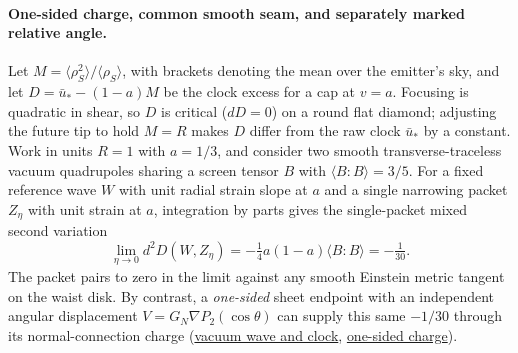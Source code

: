\documentclass[10pt,a4paper]{article}
\numberwithin{equation}{section}
\newcommand{\repo}[2]{\href{https://github.com/sprajs/quantum-gravity/blob/main/#1}{#2}}
\begin{document}
\paragraph{One-sided charge, common smooth seam, and separately marked relative angle.}
Let $M=\langle\rho_S^2\rangle/\langle\rho_S\rangle$, with brackets denoting the mean over the emitter's sky, and let $D=\bar u_*-(1-a)M$ be the clock excess for a cap at $v=a$. Focusing is quadratic in shear, so $D$ is critical ($dD=0$) on a round flat diamond; adjusting the future tip to hold $M=R$ makes $D$ differ from the raw clock $\bar u_*$ by a constant. Work in units $R=1$ with $a=1/3$, and consider two smooth transverse-traceless vacuum quadrupoles sharing a screen tensor $B$ with $\langle B:B\rangle=3/5$. For a fixed reference wave $W$ with unit radial strain slope at $a$ and a single narrowing packet $Z_\eta$ with unit strain at $a$, integration by parts gives the single-packet mixed second variation
\begin{equation}
 \lim_{\eta\to0} d^2D(W,Z_\eta)
 =-\tfrac14a(1-a)\langle B:B\rangle=-\tfrac1{30}.
 \label{eq:joint-hessian}
\end{equation}
The packet pairs to zero in the limit against any smooth Einstein metric tangent on the waist disk. By contrast, a \emph{one-sided} sheet endpoint with an independent angular displacement $V=G_N\nabla P_2(\cos\theta)$ can supply this same $-1/30$ through its normal-connection charge (\repo{audit/joint-flat-hessian.md}{vacuum wave and clock}, \repo{audit/joint-angular.md}{one-sided charge}).
\end{document}
